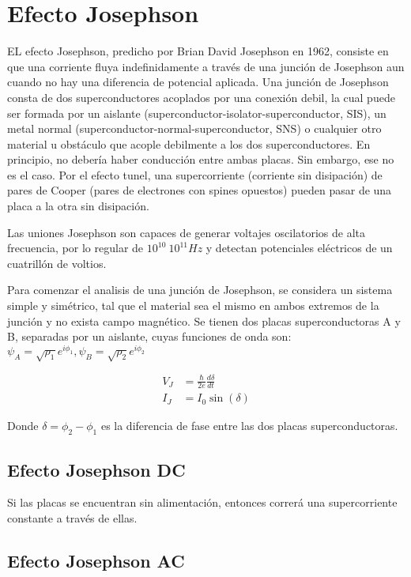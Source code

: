 \section{Efecto Josephson}

EL efecto Josephson, predicho por Brian David Josephson en 1962, consiste en que una corriente fluya indefinidamente a través de una junción de Josephson aun cuando no hay una diferencia de potencial aplicada. Una junción de Josephson consta de dos superconductores acoplados por una conexión debil, la cual puede ser formada por un aislante (superconductor-isolator-superconductor, SIS), un metal normal (superconductor-normal-superconductor, SNS) o cualquier otro material u obstáculo que acople debilmente a los dos superconductores. En principio, no debería haber conducción entre ambas placas.  Sin embargo, ese no es el caso. Por el efecto tunel, una supercorriente (corriente sin disipación) de pares de Cooper (pares de electrones con spines opuestos) pueden pasar de una placa a la otra sin disipación.

Las uniones Josephson son capaces de generar voltajes oscilatorios de alta frecuencia, por lo regular de $10^{10} ~ 10^{11} Hz$ y detectan potenciales eléctricos de un cuatrillón de voltios.

Para comenzar el analisis de una junción de Josephson, se considera un sistema simple y simétrico, tal que el material sea el mismo en ambos extremos de la junción y no exista campo magnético. Se tienen dos placas superconductoras A y B, separadas por un aislante, cuyas funciones de onda son: $\psi_A = \sqrt{\rho_1} e^{i \phi_1}, \psi_B = \sqrt{\rho_2} e^{i \phi_2}$ 


\begin{align}
    V_J &= \frac{\hbar}{2e} \frac{d\delta}{dt} \\
    I_J &= I_0 \sin(\delta)
\end{align}

Donde $\delta=\phi_2-\phi_1$ es la diferencia de fase entre las dos placas superconductoras.

\subsection{Efecto Josephson DC}

Si las placas se encuentran sin alimentación, entonces correrá una supercorriente constante a través de ellas.

\subsection{Efecto Josephson AC}

